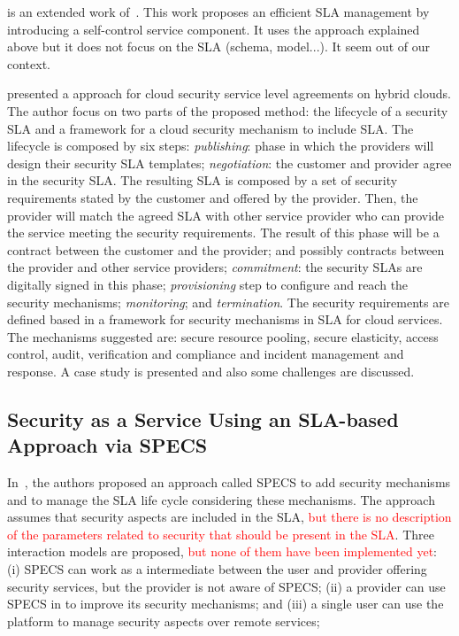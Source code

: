 \documentclass[12pt,a4paper,oneside]{article}
\begin{document}
\bigskip
\cite{008} is an extended work of~\cite{009}. This work proposes an efficient SLA management by introducing a self-control service component. It uses the approach explained above but it does not focus on the SLA (schema, model...). It seem out of our context.

\bigskip
\cite{011} presented a approach for cloud security service level agreements on hybrid clouds. The author focus on two parts of the proposed method: the lifecycle of a security SLA and a framework for a cloud security mechanism to include SLA. The lifecycle is composed by six steps: \textit{publishing}: phase in which the providers will design their security SLA templates; \textit{negotiation}: the customer and provider agree in the security SLA. The resulting SLA is composed by a set of security requirements stated by the customer and offered by the provider. Then, the provider will match the agreed SLA with other service provider who can provide the service meeting the security requirements. The result of this phase will be a contract between the customer and the provider; and possibly contracts between the provider and other service providers; \textit{commitment}: the security SLAs are digitally signed in this phase; \textit{provisioning} step to configure and reach the security mechanisms; \textit{monitoring}; and \textit{termination}. The security requirements are defined based in a framework for security mechanisms in SLA for cloud services. The mechanisms suggested are: secure resource pooling, secure elasticity, access control, audit, verification and compliance and incident management and response. A case study is presented and also some challenges are discussed.

\subsection{Security as a Service Using an SLA-based Approach via SPECS}

In~\cite{050}, the authors proposed an approach called SPECS to add security mechanisms and to manage the SLA life cycle considering these mechanisms. The approach assumes that  security aspects are included in the SLA, \textcolor{red}{but there is no description of the parameters related to security that should be present in the SLA}. Three interaction models are proposed, \textcolor{red}{but none of them have been implemented yet}: (i) SPECS can work as a intermediate between the user and provider offering security services, but the provider is not aware of SPECS; (ii) a provider can use SPECS in to improve its security mechanisms; and (iii) a single user can use the platform to manage security aspects over remote services; 
\end{document}
